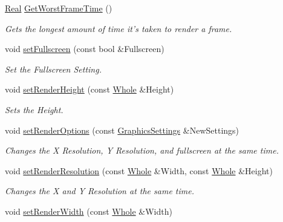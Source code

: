 \begin{DoxyCompactItemize}
\hyperlink{namespaceMezzanine_a726731b1a7df72bf3583e4a97282c6f6}{Real} \hyperlink{classMezzanine_1_1GameWindow_ae07e3a1d5e1ceef524ce29e0c255c78b}{GetWorstFrameTime} ()
\begin{DoxyCompactList}\small\item\em Gets the longest amount of time it's taken to render a frame. \item\end{DoxyCompactList}\item 
void \hyperlink{classMezzanine_1_1GameWindow_a874b538cd9735478f32329c06e832360}{setFullscreen} (const bool \&Fullscreen)
\begin{DoxyCompactList}\small\item\em Set the Fullscreen Setting. \item\end{DoxyCompactList}\item 
void \hyperlink{classMezzanine_1_1GameWindow_a485f45b9265b6fb9d6baae88171b8c74}{setRenderHeight} (const \hyperlink{namespaceMezzanine_adcbb6ce6d1eb4379d109e51171e2e493}{Whole} \&Height)
\begin{DoxyCompactList}\small\item\em Sets the Height. \item\end{DoxyCompactList}\item 
void \hyperlink{classMezzanine_1_1GameWindow_a89368aaeda12eb454ee951a44a65cb8b}{setRenderOptions} (const \hyperlink{structMezzanine_1_1GraphicsSettings}{GraphicsSettings} \&NewSettings)
\begin{DoxyCompactList}\small\item\em Changes the X Resolution, Y Resolution, and fullscreen at the same time. \item\end{DoxyCompactList}\item 
void \hyperlink{classMezzanine_1_1GameWindow_abf4ede4f1d14639017d8cd4da7490b44}{setRenderResolution} (const \hyperlink{namespaceMezzanine_adcbb6ce6d1eb4379d109e51171e2e493}{Whole} \&Width, const \hyperlink{namespaceMezzanine_adcbb6ce6d1eb4379d109e51171e2e493}{Whole} \&Height)
\begin{DoxyCompactList}\small\item\em Changes the X and Y Resolution at the same time. \item\end{DoxyCompactList}\item 
void \hyperlink{classMezzanine_1_1GameWindow_a9228766fbdf9fc77b104647e49226a0d}{setRenderWidth} (const \hyperlink{namespaceMezzanine_adcbb6ce6d1eb4379d109e51171e2e493}{Whole} \&Width)

\end{DoxyCompactItemize}
